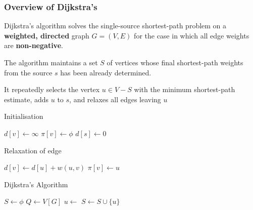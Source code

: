 \documentclass{beamer}
\begin{document}
\begin{frame}
	\frametitle{Overview of Dijkstra's}
	Dijkstra's algorithm solves the single-source shortest-path problem on a \textbf{weighted, directed} graph \( G = (V, E) \) for the case in which all edge weights are \textbf{non-negative}.\newline

	The algorithm maintains  a set \( S \) of vertices whose final shortest-path weights from the source \( s \) has been already determined. \newline

	It repeatedly selects the vertex \( u \in V - S \) with the minimum shortest-path estimate, adds \( u \) to \( s \), and relaxes all edges leaving \( u \) 
\end{frame}

\begin{frame}
\begin{algorithm}[H]
		\caption{Initialisation}
		\begin{algorithmic}[1]
			\State \( d[v] \gets \infty \) 
			\State \( \pi[v] \gets \phi \) 
			\EndFor
			\State \( d[s] \gets 0 \) 
			\EndFunction
		\end{algorithmic}
	\end{algorithm}
\end{frame}

\begin{frame}
	\begin{algorithm}[H]
		\caption{Relaxation of edge}
		\begin{algorithmic}[1]
				\State \( d[v] \gets d[u] + w(u,v) \) 
				\State \( \pi[v] \gets u \) 
			\EndIf
			\EndFunction
		\end{algorithmic}
	\end{algorithm}
\end{frame}

\begin{frame}
	\begin{algorithm}[H]
		\caption{Dijkstra's Algorithm}
		\begin{algorithmic}[1]
			\State {}
			\State \( S \gets \phi \) 	
			\State \( Q \gets V[G] \) 
				\State \( u \gets \) 
				\State \( S \gets S \cup \{u\} \) 
					\State {}
				\EndFor
			\EndWhile
			\EndFunction
		\end{algorithmic}
	\end{algorithm}
\end{frame}
\end{document}
